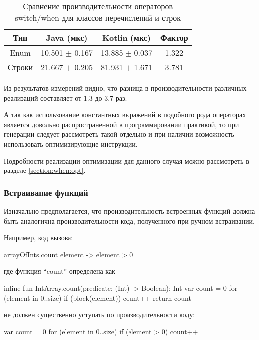 \begin{table}[h]
\begin{center}
\begin{tabular}{|c|c|c|c|} \hline
Тип & Java (мкс) & Kotlin (мкс) & Фактор \\ \hline
Enum & 10.501 $\pm$ 0.167 & 13.885 $\pm$ 0.037 & 1.322\\ \hline
Строки & 21.667 $\pm$ 0.205 & 81.931 $\pm$ 1.671 & 3.781\\ \hline
\end{tabular}
\caption{Сравнение производительности операторов switch/when для классов перечислений и строк}
\end{center}
\end{table}

Из результатов измерений видно, что разница в производительности различных реализаций
составляет от $1.3$ до $3.7$ раз.

А так как использование константных выражений в подобного рода операторах является довольно
распространенной в программировании практикой, то при генерации следует рассмотреть такой
отдельно и при наличии возможность использовать оптимизирующие инструкции.

Подробности реализации оптимизации для данного случая можно рассмотреть в разделе \ref{section:when:opt}.

\subsubsection{Встраивание функций}
\label{section:inline:bm}
Изначально предполагается, что производительность встроенных функций должна быть аналогична
производительности кода, полученного при ручном встраивании.

Например, код вызова:
\begin{pyglist}[language=kotlin]
    arrayOfInts.count { element -> element > 0 }
\end{pyglist}

где функция ``count'' определена как
\begin{pyglist}[language=kotlin]
    inline fun IntArray.count(predicate: (Int) -> Boolean): Int {
        var count = 0
        for (element in 0..size) {
            if (block(element)) {
                count++
            }
        }
        return count
    }
\end{pyglist}
не должен существенно уступать по производительности коду:
\begin{pyglist}[language=kotlin]
        var count = 0
        for (element in 0..size) {
            if (element > 0) {
                count++
            }
        }
\end{pyglist}

